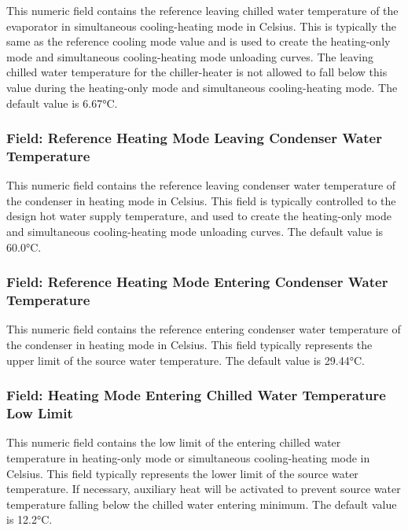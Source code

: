 This numeric field contains the reference leaving chilled water temperature of the evaporator in simultaneous cooling-heating mode in Celsius. This is typically the same as the reference cooling mode value and is used to create the heating-only mode and simultaneous cooling-heating mode unloading curves. The leaving chilled water temperature for the chiller-heater is not allowed to fall below this value during the heating-only mode and simultaneous cooling-heating mode. The default value is 6.67°C.

\subsubsection{Field: Reference Heating Mode Leaving Condenser Water Temperature}\label{field-reference-heating-mode-leaving-condenser-water-temperature}

This numeric field contains the reference leaving condenser water temperature of the condenser in heating mode in Celsius. This field is typically controlled to the design hot water supply temperature, and used to create the heating-only mode and simultaneous cooling-heating mode unloading curves. The default value is 60.0°C.

\subsubsection{Field: Reference Heating Mode Entering Condenser Water Temperature}\label{field-reference-heating-mode-entering-condenser-water-temperature}

This numeric field contains the reference entering condenser water temperature of the condenser in heating mode in Celsius. This field typically represents the upper limit of the source water temperature. The default value is 29.44°C.

\subsubsection{Field: Heating Mode Entering Chilled Water Temperature Low Limit}\label{field-heating-mode-entering-chilled-water-temperature-low-limit}

This numeric field contains the low limit of the entering chilled water temperature in heating-only mode or simultaneous cooling-heating mode in Celsius. This field typically represents the lower limit of the source water temperature. If necessary, auxiliary heat will be activated to prevent source water temperature falling below the chilled water entering minimum. The default value is 12.2°C.

